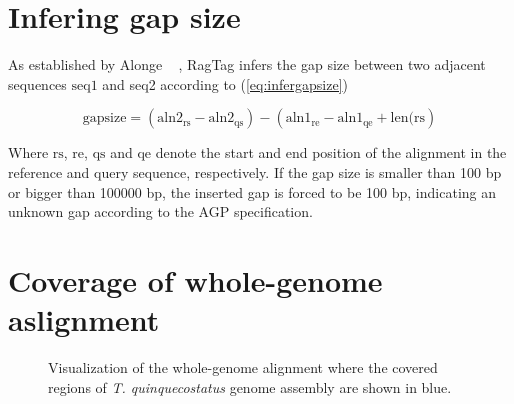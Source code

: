 \section*{Infering gap size} \label{sec:infergapsize}
As established by Alonge \etal ~ \cite{alongeAutomatedAssemblyScaffolding2022}, RagTag infers the gap size between two adjacent sequences $\textrm{seq1}$ and \textrm{seq2} according to (\ref{eq:infergapsize})

\begin{equation}\label{eq:infergapsize}
\textrm{gapsize}  = \left(\textrm{aln2}_\textrm{rs} - \textrm{aln2}_\textrm{qs}\right) - \left(\textrm{aln1}_\textrm{re} - \textrm{aln1}_\textrm{qe} + \textrm{len}(\textrm{rs}\right)
\end{equation}

Where $\textrm{rs}$, $\textrm{re}$, $\textrm{qs}$ and $\textrm{qe}$ denote the start and end position of the alignment in the reference and query sequence, respectively. If the gap size is smaller than 100 bp or bigger than 100000 bp, the inserted gap is forced to be 100 bp, indicating an unknown gap according to the AGP specification.~\cite{AGPSpecificationV2} 

\section{Coverage of whole-genome aslignment}

\graphicspath{{gfx/}}
\begin{sidewaysfigure}
\centering

\caption{Visualization of the whole-genome alignment where the covered regions of \textit{T. quinquecostatus} genome assembly are shown in blue. }    
\label{fig:coverage}
\end{sidewaysfigure} 